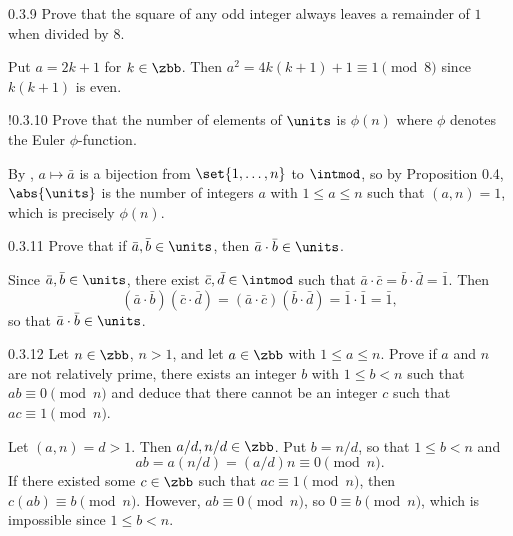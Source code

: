 \begin{exercise}{0.3.9}
    Prove that the square of any odd integer always leaves a remainder of $1$ when divided by $8$.
\end{exercise}

\begin{sol}
    Put $a = 2k + 1$ for $k \in \zbb$.
	Then $a^2 = 4k(k + 1) + 1 \equiv 1 \pmod 8$ since $k(k + 1)$ is even.
\end{sol}

\begin{exercise}!{0.3.10}
    Prove that the number of elements of $\units$ is $\phi(n)$ where $\phi$ denotes the Euler $\phi$-function.
\end{exercise}

\begin{sol}
    By , $a \mapsto \bar a$ is a bijection from $\set{1, \ldots, n}$ to $\intmod$, so by Proposition 0.4, $\abs{\units}$ is the number of integers $a$ with $1 \leq a \leq n$ such that $(a, n) = 1$, which is precisely $\phi(n)$.
\end{sol}

\begin{exercise}{0.3.11}
    Prove that if $\bar a, \bar b \in \units$, then $\bar a \cdot \bar b \in \units$.
\end{exercise}

\begin{sol}
    Since $\bar a, \bar b \in \units$, there exist $\bar c, \bar d \in \intmod$ such that $\bar a \cdot \bar c = \bar b \cdot \bar d = \bar 1$.
	Then
    \[
    	(\bar a \cdot \bar b)(\bar c \cdot \bar d) = (\bar a \cdot \bar c)(\bar b \cdot \bar d) = \bar 1 \cdot \bar 1 = \bar 1,
    \]
    so that $\bar a \cdot \bar b \in \units$.
\end{sol}

\begin{exercise}{0.3.12}
    Let $n \in \zbb$, $n > 1$, and let $a \in \zbb$ with $1 \leq a \leq n$.
	Prove if $a$ and $n$ are not relatively prime, there exists an integer $b$ with $1 \leq b < n$ such that $ab \equiv 0 \pmod n$ and deduce that there cannot be an integer $c$ such that $ac \equiv 1 \pmod n$.
\end{exercise}

\begin{sol}
    Let $(a, n) = d > 1$.
	Then $a/d, n/d \in \zbb$.
	Put $b = n/d$, so that $1 \leq b < n$ and
    \[
    	ab = a(n/d) = (a/d)n \equiv 0 \pmod n.
    \]
    If there existed some $c \in \zbb$ such that $ac \equiv 1 \pmod n$, then $c(ab) \equiv b \pmod n$.
	However, $ab \equiv 0 \pmod n$, so $0 \equiv b \pmod n$, which is impossible since $1 \leq b < n$.
\end{sol}

